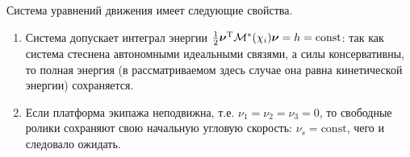 Система уравнений движения имеет следующие свойства.
\begin{enumerate}[wide]
    \item Система допускает интеграл энергии $\frac{1}{2}\boldsymbol{\mathbf{\nu}}^\mathrm{T}\mathcal{M}^*(\chi_i)\boldsymbol{\mathbf{\nu}} = h = \mathrm{const}$: так как система стеснена автономными идеальными связями, а силы консервативны, то полная энергия (в рассматриваемом здесь случае она равна кинетической энергии) сохраняется.
    
    \item Если платформа экипажа неподвижна, т.е. $\nu_1 = \nu_2 = \nu_3 = 0$, то свободные ролики сохраняют свою начальную угловую скорость: $\nu_s = \mathrm{const}$, чего и следовало ожидать.
   

\end{enumerate}
